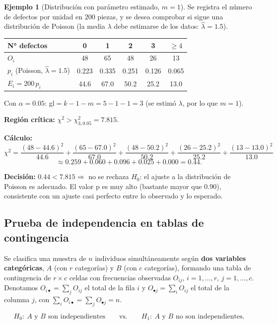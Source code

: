 \documentclass[11pt,a4paper]{article}
\theoremstyle{plain}
\theoremstyle{definition}
\newtheorem{ejemplo}[teorema]{Ejemplo}
\theoremstyle{remark}
\begin{document}
\begin{ejemplo}[Distribución con parámetro estimado, $m=1$]
Se registra el número de defectos por unidad en $200$ piezas, y se desea comprobar si sigue una distribución de Poisson (la media $\lambda$ debe estimarse de los datos: $\hat\lambda=1.5$).
\begin{center}
\small
\begin{tabular}{@{}lccccc@{}}
\toprule
N° defectos & 0 & 1 & 2 & 3 & $\ge4$ \\
\midrule
$O_i$ & 48 & 65 & 48 & 26 & 13 \\
$p_i$ (Poisson, $\hat\lambda=1.5$) & 0.223 & 0.335 & 0.251 & 0.126 & 0.065 \\
$E_i=200\,p_i$ & 44.6 & 67.0 & 50.2 & 25.2 & 13.0 \\
\bottomrule
\end{tabular}
\end{center}
Con $\alpha=0.05$: gl$=k-1-m=5-1-1=3$ (se estimó $\lambda$, por lo que $m=1$).

\textbf{Región crítica:} $\chi^2>\chi^2_{3,0.05}=7.815$.

\textbf{Cálculo:}
\[
\chi^2=\frac{(48-44.6)^2}{44.6}+\frac{(65-67.0)^2}{67.0}+\frac{(48-50.2)^2}{50.2}+\frac{(26-25.2)^2}{25.2}+\frac{(13-13.0)^2}{13.0}
\]
\[
\approx 0.259+0.060+0.096+0.025+0.000=0.44.
\]

\textbf{Decisión:} $0.44<7.815\Rightarrow$ no se rechaza $H_0$: el ajuste a la distribución de Poisson es adecuado. El valor p es muy alto (bastante mayor que $0.90$), consistente con un ajuste casi perfecto entre lo observado y lo esperado.
\end{ejemplo}

\subsection{Prueba de independencia en tablas de contingencia}

Se clasifica una muestra de $n$ individuos simultáneamente según \textbf{dos variables categóricas}, $A$ (con $r$ categorías) y $B$ (con $c$ categorías), formando una tabla de contingencia de $r\times c$ celdas con frecuencias observadas $O_{ij}$, $i=1,\dots,r$, $j=1,\dots,c$. Denotamos $O_{i\bullet}=\sum_j O_{ij}$ el total de la fila $i$ y $O_{\bullet j}=\sum_i O_{ij}$ el total de la columna $j$, con $\sum_i O_{i\bullet}=\sum_j O_{\bullet j}=n$.

\[
H_0:\ A \text{ y } B \text{ son independientes} \qquad \text{vs.}\qquad H_1:\ A \text{ y } B \text{ no son independientes}.
\]
\end{document}
